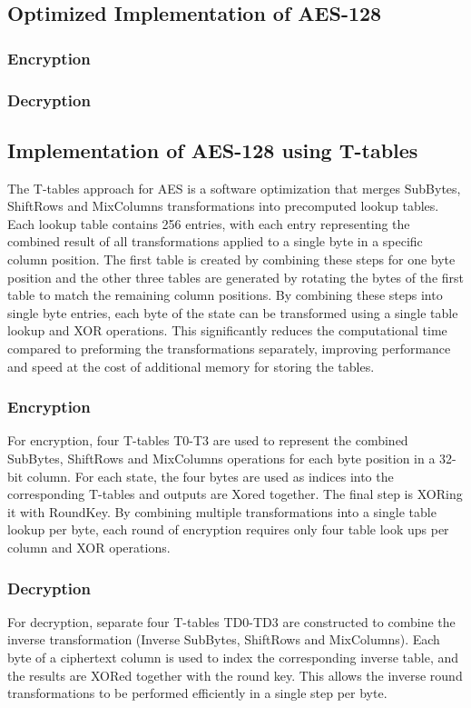 \subsection{Optimized Implementation of AES-128}

\subsubsection{Encryption}

\subsubsection{Decryption}


\subsection{Implementation of AES-128 using T-tables}
The T-tables approach for AES is a software optimization that merges SubBytes, ShiftRows and MixColumns transformations into precomputed lookup tables. Each lookup table contains 256 entries, with each entry representing the combined result of all transformations applied to a single byte in a specific column position. The first table is created by combining these steps for one byte position and the other three tables are generated by rotating the bytes of the first table to match the remaining column positions. By combining these steps into single byte entries, each byte of the state can be transformed using a single table lookup and XOR operations. This significantly reduces the computational time compared to preforming the transformations separately, improving performance and speed at the cost of additional memory for storing the tables.


\subsubsection{Encryption}
For encryption, four T-tables T0-T3 are used to represent the combined SubBytes, ShiftRows and MixColumns operations for each byte position in a 32-bit column. For each state, the four bytes are used as indices into the corresponding T-tables and outputs are Xored together. The final step is XORing it with RoundKey. By combining multiple transformations into a single table lookup per byte, each round of encryption requires only four table look ups per column and XOR operations.


\subsubsection{Decryption}
For decryption, separate four T-tables TD0-TD3 are constructed to combine the inverse transformation (Inverse SubBytes, ShiftRows and MixColumns). Each byte of a ciphertext column is used to index the corresponding inverse table, and the results are XORed together with the round key. This allows the inverse round transformations to be performed efficiently in a single step per byte.

